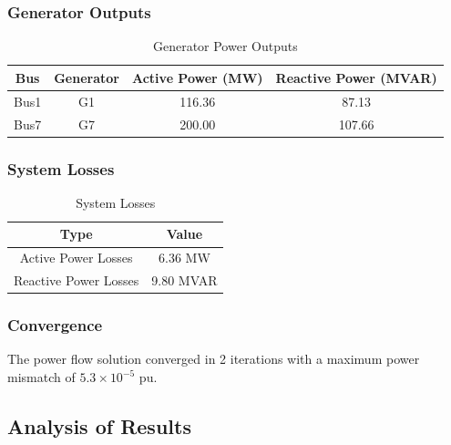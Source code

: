 \documentclass{article}
\begin{document}
	\subsubsection{Generator Outputs}
	
	\begin{table}[H]
		\centering
		\begin{tabular}{cccc}
			\hline
			\textbf{Bus} & \textbf{Generator} & \textbf{Active Power (MW)} & \textbf{Reactive Power (MVAR)} \\
			\hline
			Bus1 & G1 & 116.36 & 87.13 \\
			Bus7 & G7 & 200.00 & 107.66 \\
			\hline
		\end{tabular}
		\caption{Generator Power Outputs}
		\label{tab:generator_results}
	\end{table}
	
	\subsubsection{System Losses}
	
	\begin{table}[H]
		\centering
		\begin{tabular}{cc}
			\hline
			\textbf{Type} & \textbf{Value} \\
			\hline
			Active Power Losses & 6.36 MW \\
			Reactive Power Losses & 9.80 MVAR \\
			\hline
		\end{tabular}
		\caption{System Losses}
		\label{tab:losses}
	\end{table}
	
	\subsubsection{Convergence}
	
	The power flow solution converged in 2 iterations with a maximum power mismatch of $5.3 \times 10^{-5}$ pu.
	
	\subsection{Analysis of Results}
	
\end{document}
